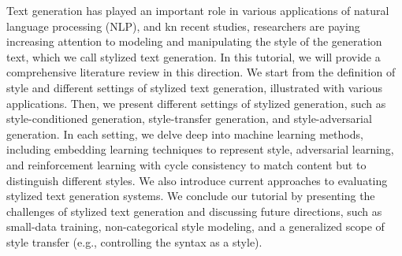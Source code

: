 Text generation has played an important role in various applications of natural language processing (NLP), and kn recent studies, researchers are paying increasing attention to modeling and manipulating the style of the generation text, which we call stylized text generation. In this tutorial, we will provide a comprehensive literature review in this direction. We start from the definition of style and different settings of stylized text generation, illustrated with various applications. Then, we present different settings of stylized generation, such as style-conditioned generation, style-transfer generation, and style-adversarial generation. In each setting, we delve deep into machine learning methods, including embedding learning techniques to represent style, adversarial learning, and reinforcement learning with cycle consistency to match content but to distinguish different styles. We also introduce current approaches to evaluating stylized text generation systems. We conclude our tutorial by presenting the challenges of stylized text generation and discussing future directions, such as small-data training, non-categorical style modeling, and a generalized scope of style transfer (e.g., controlling the syntax as a style).
